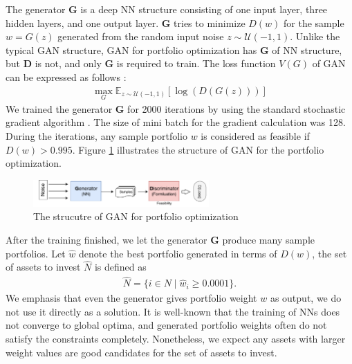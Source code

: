 \documentclass[11pt]{article}
\begin{document}
	The generator \textbf{G} is a deep NN structure consisting of one input layer, three hidden layers, and one output layer. \textbf{G} tries to minimize $D(w)$ for the sample $w=G(z)$ generated from the random input noise $z \sim \mathcal {U}(-1,1)$. 
	Unlike the typical GAN structure, GAN for portfolio optimization has \textbf{G} of NN structure, but \textbf{D} is not, and only \textbf{G} is required to train. The loss function $V(G)$ of GAN can be expressed as follows :
	\begin{align*}
	\max_G \mathbb{E}_{z \sim \mathcal {U}(-1,1)}\left[\log(D(G(z)))\right] 
	\end{align*}
	We trained the generator \textbf{G} for 2000 iterations by using the standard stochastic gradient algorithm \citep{bottou2010large}. The size of mini batch for the gradient calculation was 128. During the iterations, any sample portfolio $w$ is considered as feasible if $D(w) > 0.995$. Figure \ref{fig:GAN-port} illustrates the structure of GAN for the portfolio optimization. 
	\begin{figure}[] 
		\begin{center}
			\includegraphics[width=0.6\textwidth]{GAN_port}
			\caption{The strucutre of GAN for portfolio optimization} \label{fig:GAN-port}
		\end{center}
	\end{figure}
	
	After the training finished, we let the generator \textbf{G} produce many sample portfolios. Let $\hat{w}$ denote the best portfolio generated in terms of $D(w)$, the set of assets to invest $\hat{N}$ is defined as
	\begin{align}
	\hat{N} = \{ i \in N \mid \hat{w}_i \ge 0.0001 \}.
	\end{align}
	We emphasis that even the generator gives portfolio weight $w$ as output, we do not use it directly as a solution. It is well-known that the training of NNs does not converge to global optima, and generated portfolio weights often do not satisfy the constraints completely. Nonetheless, we expect any assets with larger weight values are good candidates for the set of assets to invest. 
	
\end{document}
